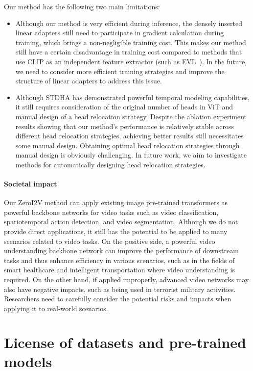 Our method has the following two main limitations:
\begin{itemize}
    \item Although our method is very efficient during inference, the densely inserted linear adapters still need to participate in gradient calculation during training, which brings a non-negligible training cost. This makes our method still have a certain disadvantage in training cost compared to methods that use CLIP as an independent feature extractor (such as EVL~\citep{evl}). In the future, we need to consider more efficient training strategies and improve the structure of linear adapters to address this issue.
    \item Although STDHA has demonstrated powerful temporal modeling capabilities, it still requires consideration of the original number of heads in ViT and manual design of a head relocation strategy. Despite the ablation experiment results showing that our method’s performance is relatively stable across different head relocation strategies, achieving better results still necessitates some manual design. Obtaining optimal head relocation strategies through manual design is obviously challenging. In future work, we aim to investigate methods for automatically designing head relocation strategies.
\end{itemize}

\paragraph{Societal impact}
Our ZeroI2V method can apply existing image pre-trained transformers as powerful backbone networks for video tasks such as video classification, spatiotemporal action detection, and video segmentation. Although we do not provide direct applications, it still has the potential to be applied to many scenarios related to video tasks. On the positive side, a powerful video understanding backbone network can improve the performance of downstream tasks and thus enhance efficiency in various scenarios, such as in the fields of smart healthcare and intelligent transportation where video understanding is required. On the other hand, if applied improperly, advanced video networks may also have negative impacts, such as being used in terrorist military activities. Researchers need to carefully consider the potential risks and impacts when applying it to real-world scenarios.


\section{License of datasets and pre-trained models}
\label{sec:license}

